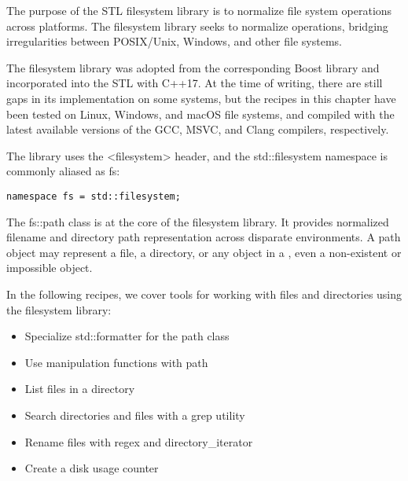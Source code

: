 The purpose of the STL filesystem library is to normalize file system operations across platforms. The filesystem library seeks to normalize operations, bridging irregularities between POSIX/Unix, Windows, and other file systems.

The filesystem library was adopted from the corresponding Boost library and incorporated into the STL with C++17. At the time of writing, there are still gaps in its implementation on some systems, but the recipes in this chapter have been tested on Linux, Windows, and macOS file systems, and compiled with the latest available versions of the GCC, MSVC, and Clang compilers, respectively.

The library uses the <filesystem> header, and the std::filesystem namespace is commonly aliased as fs:

\begin{lstlisting}[style=styleCXX]
namespace fs = std::filesystem;
\end{lstlisting}

The fs::path class is at the core of the filesystem library. It provides normalized filename and directory path representation across disparate environments. A path object may represent a file, a directory, or any object in a , even a non-existent or impossible object.


In the following recipes, we cover tools for working with files and directories using the filesystem library:

\begin{itemize}
\item 
Specialize std::formatter for the path class

\item 
Use manipulation functions with path

\item 
List files in a directory

\item 
Search directories and files with a grep utility

\item 
Rename files with regex and directory\_iterator

\item 
Create a disk usage counter
\end{itemize}











